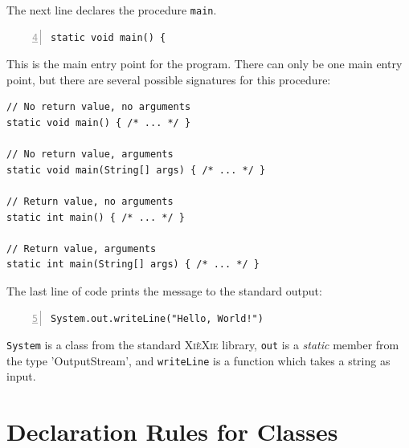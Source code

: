 \documentclass{report}
\def\xiexie{\textsc{Xi\`eXie}\xspace}
\begin{document}
The next line declares the procedure \texttt{main}.
\begin{lstlisting}[numbers=left, firstnumber=4]
static void main() {
\end{lstlisting}
This is the main entry point for the program. There can only be one main entry point, but there are several possible
signatures for this procedure:
\begin{lstlisting}
// No return value, no arguments
static void main() { /* ... */ }

// No return value, arguments
static void main(String[] args) { /* ... */ }

// Return value, no arguments
static int main() { /* ... */ }

// Return value, arguments
static int main(String[] args) { /* ... */ }
\end{lstlisting}

The last line of code prints the message to the standard output:
\begin{lstlisting}[numbers=left, firstnumber=5]
System.out.writeLine("Hello, World!")
\end{lstlisting}
\texttt{System} is a class from the standard \xiexie library, \texttt{out} is a \textit{static} member
from the type 'OutputStream', and \texttt{writeLine} is a function which takes a string as input.



\section{Declaration Rules for Classes}
\end{document}

